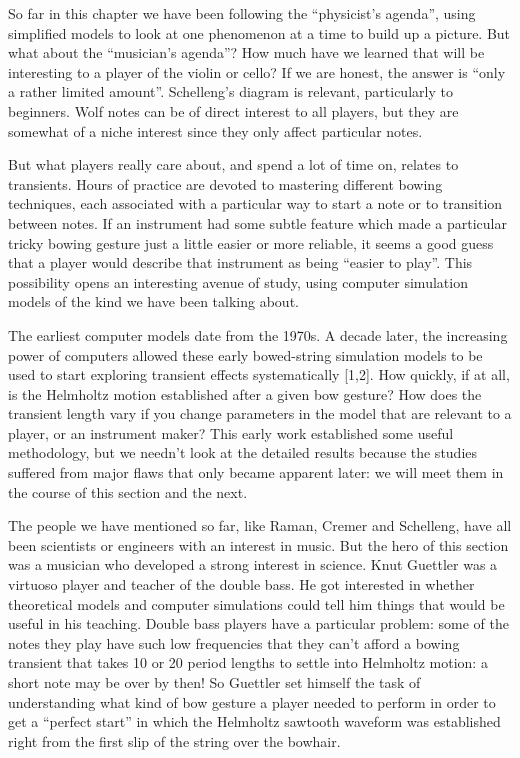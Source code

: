 

  So far in this chapter we have been following the “physicist’s agenda”, using 
  simplified models to look at one phenomenon at a time to build up a picture. 
  But what about the “musician’s agenda”? How much have we learned that will be 
  interesting to a player of the violin or cello? If we are honest, the answer 
  is ``only a rather limited amount''. Schelleng’s diagram is relevant, 
  particularly to beginners. Wolf notes can be of direct interest to all 
  players, but they are somewhat of a niche interest since they only affect 
  particular notes. 

  But what players really care about, and spend a lot of time on, relates to 
  transients. Hours of practice are devoted to mastering different bowing 
  techniques, each associated with a particular way to start a note or to 
  transition between notes. If an instrument had some subtle feature which made 
  a particular tricky bowing gesture just a little easier or more reliable, it 
  seems a good guess that a player would describe that instrument as being 
  “easier to play”. This possibility opens an interesting avenue of study, 
  using computer simulation models of the kind we have been talking about. 

  The earliest computer models date from the 1970s. A decade later, the 
  increasing power of computers allowed these early bowed-string simulation 
  models to be used to start exploring transient effects systematically [1,2]. 
  How quickly, if at all, is the Helmholtz motion established after a given bow 
  gesture? How does the transient length vary if you change parameters in the 
  model that are relevant to a player, or an instrument maker? This early work 
  established some useful methodology, but we needn’t look at the detailed 
  results because the studies suffered from major flaws that only became 
  apparent later: we will meet them in the course of this section and the next. 

  The people we have mentioned so far, like Raman, Cremer and Schelleng, have 
  all been scientists or engineers with an interest in music. But the hero of 
  this section was a musician who developed a strong interest in science. Knut 
  Guettler was a virtuoso player and teacher of the double bass. He got 
  interested in whether theoretical models and computer simulations could tell 
  him things that would be useful in his teaching. Double bass players have a 
  particular problem: some of the notes they play have such low frequencies 
  that they can’t afford a bowing transient that takes 10 or 20 period lengths 
  to settle into Helmholtz motion: a short note may be over by then! So 
  Guettler set himself the task of understanding what kind of bow gesture a 
  player needed to perform in order to get a “perfect start” in which the 
  Helmholtz sawtooth waveform was established right from the first slip of the 
  string over the bowhair. 

